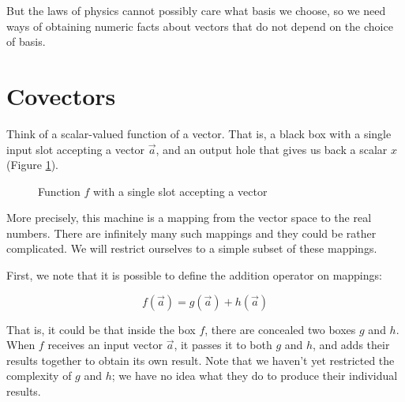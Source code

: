 But the laws of physics cannot possibly care what basis we choose, so we need ways of obtaining numeric facts about vectors that do not depend on the choice of basis.

\section{Covectors}

Think of a scalar-valued function of a vector. That is, a black box with a single input slot accepting a vector $\vec{a}$, and an output hole that gives us back a scalar $x$ (Figure \ref{fig:1-slot-box}).

\begin{figure}[h]
    \centering
    \caption{Function $f$ with a single slot accepting a vector} \label{fig:1-slot-box}
\end{figure}

More precisely, this machine is a mapping from the vector space to the real numbers. There are infinitely many such mappings and they could be rather complicated. We will restrict ourselves to a simple subset of these mappings.

First, we note that it is possible to define the addition operator on mappings:

$$
f(\vec{a}) = g(\vec{a}) + h(\vec{a})
$$

That is, it could be that inside the box $f$, there are concealed two boxes $g$ and $h$. When $f$ receives an input vector $\vec{a}$, it passes it to both $g$ and $h$, and adds their results together to obtain its own result. Note that we haven't yet restricted the complexity of $g$ and $h$; we have no idea what they do to produce their individual results.

